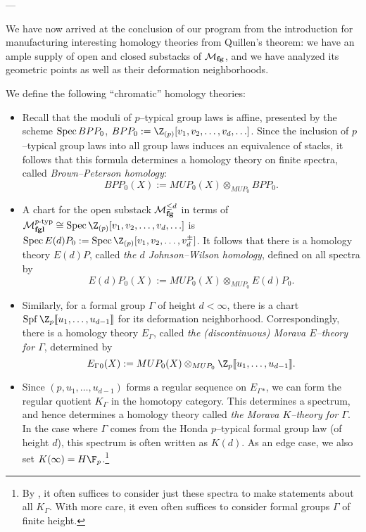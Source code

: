 ---


We have now arrived at the conclusion of our program from the introduction for manufacturing interesting homology theories from Quillen's theorem: we have an ample supply of open and closed substacks of $\mathcal{M}_{\mathbf{fg}}$, and we have analyzed its geometric points as well as their deformation neighborhoods.
\begin{definition}
We define the following ``chromatic'' homology theories:
\begin{itemize}
\item Recall that the moduli of $p$--typical group laws is affine, presented by the scheme $\operatorname{Spec} BPP_0$, $BPP_0 := \Z_{(p)}[v_1, v_2, \ldots, v_d, \ldots]$.  Since the inclusion of $p$--typical group laws into all group laws induces an equivalence of stacks, it follows that this formula determines a homology theory on finite spectra, called \textit{Brown--Peterson homology}: \[BPP_0(X) := MUP_0(X) \otimes_{MUP_0} BPP_0.\]
\item A chart for the open substack $\mathcal{M}_{\mathbf{fg}}^{\le d}$ in terms of $\moduli{fgl}^{\ptyp} \cong \Spec \Z_{(p)}[v_1, v_2, \ldots, v_d, \ldots]$ is $\Spec E(d)P_0 := \Spec \Z_{(p)}[v_1, v_2, \ldots, v_d^\pm]$.  It follows that there is a homology theory $E(d)P$, called \textit{the $d${\th} Johnson--Wilson homology}, defined on all spectra by \[E(d)P_0(X) := MUP_0(X) \otimes_{MUP_0} E(d)P_0.\]
\item Similarly, for a formal group $\Gamma$ of height $d < \infty$, there is a chart $\Spf \Z_p\ps{u_1, \ldots, u_{d-1}}$ for its deformation neighborhood.  Correspondingly, there is a homology theory $E_\Gamma{}$, called \textit{the (discontinuous) Morava $E$--theory for $\Gamma$}, determined by \[E_\Gamma{}_0(X) := MUP_0(X) \otimes_{MUP_0} \Z_p\ps{u_1, \ldots, u_{d-1}}.\] 
\item Since $(p, u_1, \ldots, u_{d-1})$ forms a regular sequence on $E_\Gamma{}_*$, we can form the regular quotient $K_\Gamma$ in the homotopy category.  This determines a spectrum, and hence determines a homology theory called \textit{the Morava $K$--theory for $\Gamma$}.  In the case where $\Gamma$ comes from the Honda $p$--typical formal group law (of height $d$), this spectrum is often written as $K(d)$.  As an edge case, we also set $K(\infty) = H\F_p$.\footnote{By , it often suffices to consider just these spectra to make statements about all $K_\Gamma$.  With more care, it even often suffices to consider formal groups $\Gamma$ of finite height.}

\end{itemize}
\end{definition}

